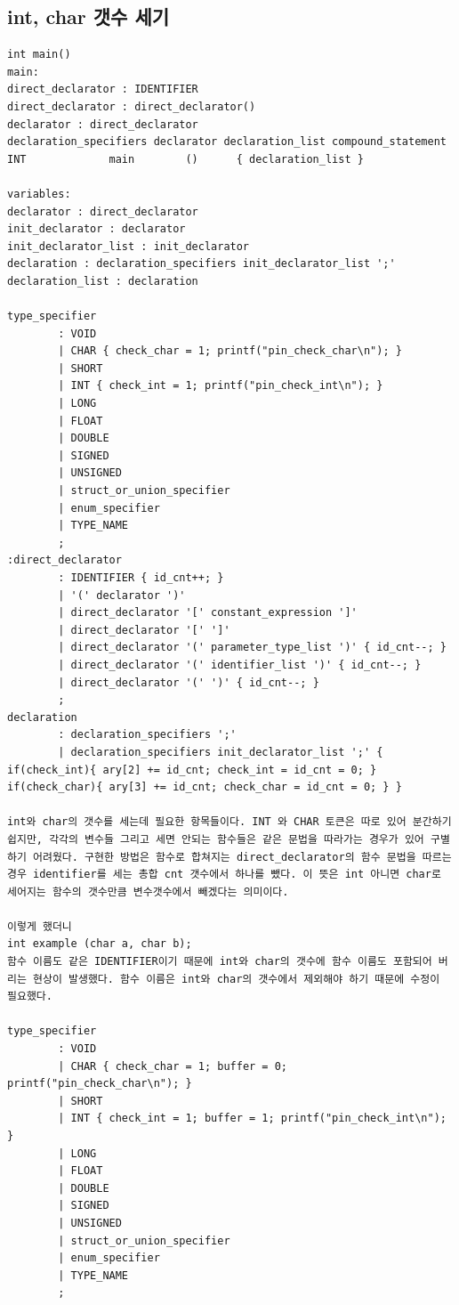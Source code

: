 \documentclass{article}
\begin{document}
\subsection{int, char 갯수 세기}
\begin{verbatim}
int main()
main:
direct_declarator : IDENTIFIER
direct_declarator : direct_declarator()
declarator : direct_declarator
declaration_specifiers declarator declaration_list compound_statement
INT				main		()		{ declaration_list }

variables:
declarator : direct_declarator
init_declarator : declarator
init_declarator_list : init_declarator
declaration : declaration_specifiers init_declarator_list ';'
declaration_list : declaration

type_specifier
        : VOID
        | CHAR { check_char = 1; printf("pin_check_char\n"); }
        | SHORT
        | INT { check_int = 1; printf("pin_check_int\n"); }
        | LONG
        | FLOAT
        | DOUBLE
        | SIGNED
        | UNSIGNED
        | struct_or_union_specifier
        | enum_specifier
        | TYPE_NAME
        ;
:direct_declarator
        : IDENTIFIER { id_cnt++; }
        | '(' declarator ')'
        | direct_declarator '[' constant_expression ']'
        | direct_declarator '[' ']'
        | direct_declarator '(' parameter_type_list ')' { id_cnt--; }
        | direct_declarator '(' identifier_list ')' { id_cnt--; }
        | direct_declarator '(' ')' { id_cnt--; }
        ;
declaration
        : declaration_specifiers ';'
        | declaration_specifiers init_declarator_list ';' { if(check_int){ ary[2] += id_cnt; check_int = id_cnt = 0; } if(check_char){ ary[3] += id_cnt; check_char = id_cnt = 0; } }

int와 char의 갯수를 세는데 필요한 항목들이다. INT 와 CHAR 토큰은 따로 있어 분간하기 쉽지만, 각각의 변수들 그리고 세면 안되는 함수들은 같은 문법을 따라가는 경우가 있어 구별하기 어려웠다. 구현한 방법은 함수로 합쳐지는 direct_declarator의 함수 문법을 따르는 경우 identifier를 세는 총합 cnt 갯수에서 하나를 뺐다. 이 뜻은 int 아니면 char로 세어지는 함수의 갯수만큼 변수갯수에서 빼겠다는 의미이다.

이렇게 했더니 
int example (char a, char b);
함수 이름도 같은 IDENTIFIER이기 때문에 int와 char의 갯수에 함수 이름도 포함되어 버리는 현상이 발생했다. 함수 이름은 int와 char의 갯수에서 제외해야 하기 때문에 수정이 필요했다. 

type_specifier
        : VOID
        | CHAR { check_char = 1; buffer = 0; printf("pin_check_char\n"); }
        | SHORT
        | INT { check_int = 1; buffer = 1; printf("pin_check_int\n"); }
        | LONG
        | FLOAT
        | DOUBLE
        | SIGNED
        | UNSIGNED
        | struct_or_union_specifier
        | enum_specifier
        | TYPE_NAME
        ;


\end{verbatim}
\end{document}
